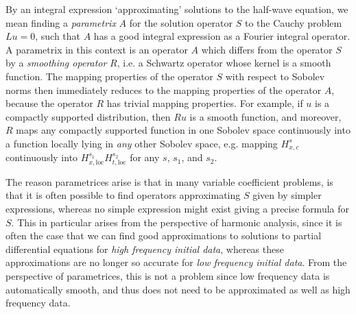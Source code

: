 \documentclass{article}
\theoremstyle{plain}
\theoremstyle{remark}
\theoremstyle{definition}
\DeclareMathOperator{\RR}{\mathbb{R}}
\begin{document}
\begin{comment}
For such an operator, we can find a countable, orthogonal basis $\{ e_\lambda : \lambda \geq 0 \}$ of $L^2(M)$, such that $Pe_\lambda = \lambda e_\lambda$, and such that for each $\lambda$, $e_\lambda$ is a smooth function, with $L^2_s$ norm $O_s(\lambda^s)$. The number of elements of this basis with eigenvalue at most $\lambda$ is $O(1 + \lambda^d)$. Given this basis, we can define a family of bounded operators $\{ e^{2 \pi itP} \}$ on $L^2(M)$ by setting $e^{2 \pi it P} e_\lambda = e^{2 \pi it \lambda} e_\lambda$, and then consider a solution operator
%
\[ (Wf)(x,t) = (e^{2 \pi it \lambda} f)(x). \]
%
Using the $L^2_s$ norm properties of the eigenfunctions $\{ e_\lambda \}$, and the fact that for any $f \in C^\infty(M)$,
%
\[ \langle f, e_\lambda \rangle \lesssim_N \lambda^{-N} \quad\text{for all $N > 0$,} \]
%
it is simple to check that $W$ maps $C^\infty(M)$ into $C^\infty_{\text{loc}}(M \times \RR)$, and that for $f \in C^\infty(M)$, the smooth function $u = Wf$ solves the equation $Lu = 0$ with initial conditions $f$. One can also prove the uniqueness of solution solutions, e.g. using energy estimates, but this takes us a little far afield of what we want to talk about in these notes.
\end{comment}

By an integral expression `approximating' solutions to the half-wave equation, we mean finding a \emph{parametrix} $A$ for the solution operator $S$ to the Cauchy problem $Lu = 0$, such that $A$ has a good integral expression as a Fourier integral operator. A parametrix in this context is an operator $A$ which differs from the operator $S$ by a \emph{smoothing operator} $R$, i.e. a Schwartz operator whose kernel is a smooth function. The mapping properties of the operator $S$ with respect to Sobolev norms then immediately reduces to the mapping properties of the operator $A$, because the operator $R$ has trivial mapping properties. For example, if $u$ is a compactly supported distribution, then $Ru$ is a smooth function, and moreover, $R$ maps any compactly supported function in one Sobolev space continuously into a function locally lying in \emph{any} other Sobolev space, e.g. mapping $H^s_{x,c}$ continuously into $H^{s_1}_{x,\text{loc}} H^{s_2}_{t,\text{loc}}$ for any $s$, $s_1$, and $s_2$.

The reason parametrices arise is that in many variable coefficient problems, is that it is often possible to find operators approximating $S$ given by simpler expressions, whereas no simple expression might exist giving a precise formula for $S$. This in particular arises from the perspective of harmonic analysis, since it is often the case that we can find good approximations to solutions to partial differential equations for \emph{high frequency initial data}, whereas these approximations are no longer so accurate for \emph{low frequency initial data}. From the perspective of parametrices, this is not a problem since low frequency data is automatically smooth, and thus does not need to be approximated as well as high frequency data.
\end{document}
